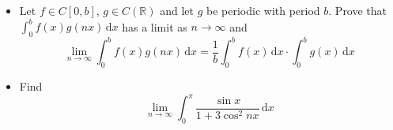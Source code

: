 \begin{itemize}
\item[(a)] Let \(f\in C[0,b]\), \(g\in C(\mathbb R)\) and let \(g\) be periodic with period \(b\). Prove that \(\int_0^b f(x) g(nx)\,\mathrm dx\) has a limit as \(n\to\infty\) and
\[\lim_{n\to\infty}\int_0^b f(x)g(nx)\,\mathrm dx=\frac 1b \int_0^b f(x)\,\mathrm dx\cdot\int_0^b g(x)\,\mathrm dx\]
\item[(b)] Find
\[\lim_{n\to\infty}\int_0^\pi \frac{\sin x}{1+3\cos^2nx}\,\mathrm dx\]
\end{itemize}
